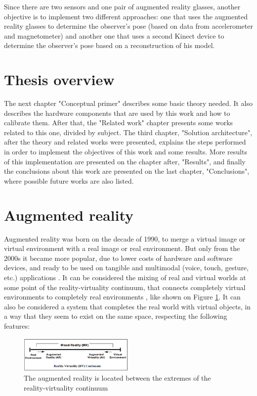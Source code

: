 \documentclass[msc, a4paper, classic, en]{ufbathesis}
\begin{document}
Since there are two sensors and one pair of augmented reality glasses, another objective is to implement two different approaches: one that
uses the augmented reality glasses to determine the observer's pose (based on data from accelerometer and magnetometer) and another one that uses a second Kinect device to determine the observer's pose based on a reconstruction of his model.

\section{Thesis overview}

The next chapter "Conceptual primer" describes some basic theory needed. It also describes the hardware components that are used by this work and how to calibrate them. After that, the "Related work" chapter presents some works related to this one, divided by subject. The third chapter, "Solution architecture", after the theory and related works were presented, explains the steps performed in order to implement the objectives of this work and some results. More results of this implementation are presented on the chapter after, "Results", and finally the conclusions about this work are presented on the last chapter, "Conclusions", where possible future works are also listed.

\section{Augmented reality}

Augmented reality was born on the decade of 1990, to merge a virtual image or virtual environment with a real image or real environment. But only from the 2000s it became more popular, due to lower costs of hardware and software devices, and ready to be used on tangible and multimodal (voice, touch, gesture, etc.) applications \cite{paddle}. It can be considered the mixing of real and virtual worlds at some point of the reality-virtuality continuum, that connects completely virtual environments to completely real environments \cite{milgram94}, like shown on Figure \ref{fig:cont}. It can also be considered a system that completes the real world with virtual objects, in a way that they seem to exist on the same space, respecting the following features:

\begin{figure}
\centering
\includegraphics[width=0.5\textwidth]{images/cont.png}
\caption{The augmented reality is located between the extremes of the reality-virtuality continuum}
\label{fig:cont}
\end{figure}
\end{document}
